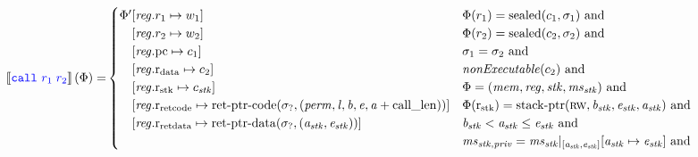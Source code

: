 \documentclass[a3paper]{article}
\newcommand{\sem}[1]{\left\llbracket #1 \right\rrbracket}
\newcommand{\tand}{\text{ and }}
\newcommand{\sourcecolor}{\color{blue}}
\newcommand{\src}[1]{{\sourcecolor #1}}
\newcommand{\zinstr}[1]{\texttt{#1}}
\newcommand{\scall}[3][]{  
\ifthenelse{\equal{#2#3}{}}
  {\ensuremath{\zinstr{\src{call}}_{#1}}}
  {\ensuremath{\zinstr{\src{call}}_{#1} \; #2 \; #3}}
}
\newcommand{\update}[2]{[#1 \mapsto #2]}
\newcommand{\updReg}[2]{\update{\reg.#1}{#2}}
\newcommand{\shareddom}[1]{\mathrm{#1}}
\newcommand{\perm}{\var{perm}}
\newcommand{\lin}{\var{l}}
\newcommand{\stkptr}[1]{\mathrm{stack\text{-}ptr}(#1)}
\newcommand{\retptrd}{\mathrm{ret\text{-}ptr\text{-}data}}
\newcommand{\retptrc}{\mathrm{ret\text{-}ptr\text{-}code}}
\newcommand{\sealed}[1]{\shareddom{sealed}(#1)}
\newcommand{\var}[1]{\mathit{#1}}
\newcommand{\reg}{\var{reg}}
\newcommand{\mem}{\var{mem}}
\newcommand{\ms}{\var{ms}}
\newcommand{\stk}{\var{stk}}
\newcommand{\priv}{\var{priv}}
\newcommand{\baddr}{\var{b}}
\newcommand{\eaddr}{\var{e}}
\newcommand{\aaddr}{\var{a}}
\newcommand{\constant}[1]{\mathrm{#1}}
\newcommand{\calllen}{\constant{call\_len}}
\newcommand{\pcreg}{\mathrm{pc}}
\newcommand{\rstk}{\mathrm{r}_\mathrm{stk}}
\newcommand{\rretc}{\mathrm{r}_\mathrm{ret code}}
\newcommand{\rretd}{\mathrm{r}_\mathrm{ret data}}
\newcommand{\rdata}{\mathrm{r}_\mathrm{data}}
\newcommand{\plainperm}[1]{\textsc{#1}}
\newcommand{\rw}{\plainperm{rw}}
\newcommand{\plainfun}[2]{
  \ifthenelse{\equal{#2}{}}
  {\mathit{#1}}
  {\mathit{#1}(#2)}
}
\newcommand{\nonExec}[1]{\plainfun{nonExecutable}{#1}}
\begin{document}
\begin{align*}
  \sem{\scall{\src{r_1}}{\src{r_2}}}(\Phi) = & 
                                               \begin{cases}
                                                 \Phi'
                                                 \arraycolsep=0pt
                                                 \begin{array}[t]{rl}
                                                   &\updReg{r_1}{w_1} \\
                                                        &\updReg{r_2}{w_2} \\
                                                        &\updReg{\pcreg}{c_1}\\
                                                        &\updReg{\rdata}{c_2}\\
                                                        &\updReg{\rstk}{c_\stk}\\
                                                        &\updReg{\rretc}{\retptrc(\sigma_?,(\perm,\lin,\baddr,\eaddr,\aaddr+\calllen))}\\
                                                        &\updReg{\rretd}{\retptrd(\sigma_?,(\aaddr_\stk,\eaddr_\stk))}
                                                 \end{array}
                                                 & 
                                                 \arraycolsep=0pt
                                                 \begin{array}[t]{l}
                                                   \Phi(r_1) = \sealed{c_1,\sigma_1} \tand \\
                                                   \Phi(r_2) = \sealed{c_2,\sigma_2} \tand \\
                                                   \sigma_1 = \sigma_2 \tand \\
                                                   \nonExec{c_2} \tand\\
                                                   \Phi = (\mem,\reg,\stk,\ms_\stk) \tand\\
                                                   \Phi(\rstk) = \stkptr{\rw,\baddr_\stk,\eaddr_\stk,\aaddr_\stk} \tand \\
                                                   \baddr_\stk < \aaddr_\stk \leq \eaddr_\stk \tand \\
                                                   \ms_{\stk,\priv} = \ms_\stk |_{[\aaddr_\stk,\eaddr_\stk]}\update{\aaddr_\stk}{\eaddr_\stk} \tand\\

\end{array}
\end{cases}
\end{align*}
\end{document}
